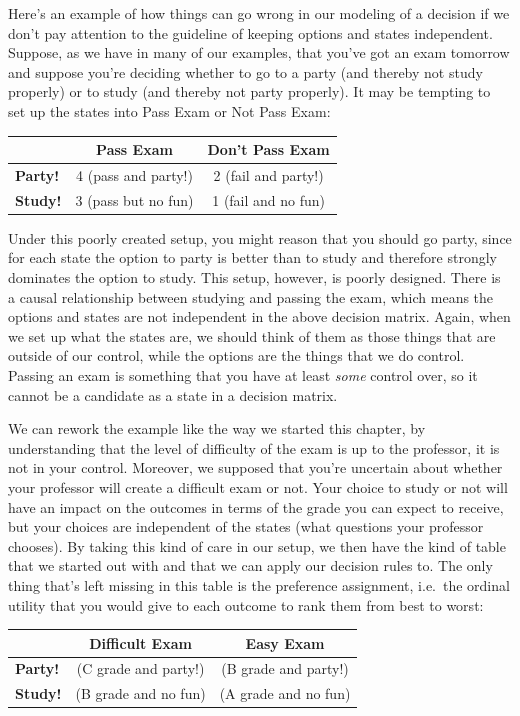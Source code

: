 \documentclass[]{tufte-book}
\begin{document}
Here's an example of how things can go wrong in our modeling of a decision if we don't pay attention to the guideline of keeping options and states independent. Suppose, as we have in many of our examples, that you've got an exam tomorrow and suppose you're deciding whether to go to a party (and thereby not study properly) or to study (and thereby not party properly). It may be tempting to set up the states into Pass Exam or Not Pass Exam:

\begin{longtable}[]{@{}lcc@{}}
\toprule
& Pass Exam & Don't Pass Exam\tabularnewline
\midrule
\endhead
\textbf{Party!} & 4 (pass and party!) & 2 (fail and party!)\tabularnewline
\textbf{Study!} & 3 (pass but no fun) & 1 (fail and no fun)\tabularnewline
\bottomrule
\end{longtable}

Under this poorly created setup, you might reason that you should go party, since for each state the option to party is better than to study and therefore strongly dominates the option to study. This setup, however, is poorly designed. There is a causal relationship between studying and passing the exam, which means the options and states are not independent in the above decision matrix. Again, when we set up what the states are, we should think of them as those things that are outside of our control, while the options are the things that we do control. Passing an exam is something that you have at least \emph{some} control over, so it cannot be a candidate as a state in a decision matrix.

We can rework the example like the way we started this chapter, by understanding that the level of difficulty of the exam is up to the professor, it is not in your control. Moreover, we supposed that you're uncertain about whether your professor will create a difficult exam or not. Your choice to study or not will have an impact on the outcomes in terms of the grade you can expect to receive, but your choices are independent of the states (what questions your professor chooses). By taking this kind of care in our setup, we then have the kind of table that we started out with and that we can apply our decision rules to. The only thing that's left missing in this table is the preference assignment, i.e.~the ordinal utility that you would give to each outcome to rank them from best to worst:

\begin{longtable}[]{@{}lcc@{}}
\toprule
& Difficult Exam & Easy Exam\tabularnewline
\midrule
\endhead
\textbf{Party!} & (C grade and party!) & (B grade and party!)\tabularnewline
\textbf{Study!} & (B grade and no fun) & (A grade and no fun)\tabularnewline
\bottomrule
\end{longtable}
\end{document}

